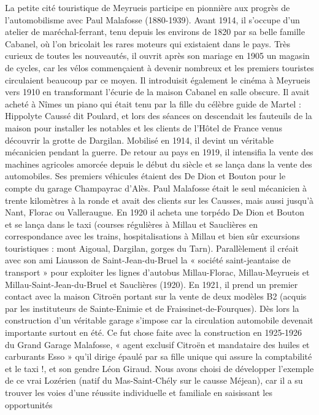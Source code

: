 La petite cité touristique de Meyrueis participe en pionnière aux progrès de l’automobilisme avec
Paul Malafosse (1880-1939). Avant 1914, il s’occupe d’un atelier de maréchal-ferrant, tenu
depuis les environs de 1820 par sa belle famille Cabanel, où l’on bricolait les rares moteurs qui
existaient dans le pays. Très curieux de toutes les nouveautés, il ouvrit après son mariage en 1905
un magasin de cycles, car les vélos commençaient à devenir nombreux et les premiers touristes circulaient beaucoup par ce moyen. Il introduisit également
le cinéma à Meyrueis vers 1910 en transformant l’écurie de la maison Cabanel en salle
obscure. Il avait acheté à Nîmes un piano qui était tenu par la fille du célèbre guide de Martel :
Hippolyte Caussé dit Poulard, et lors des séances on descendait les fauteuils de la maison pour
installer les notables et les clients de l’Hôtel de France venus découvrir la grotte de Dargilan.
Mobilisé en 1914, il devint un véritable mécanicien pendant la guerre. De retour au pays en 1919,
il intensifia la vente des machines agricoles amorcée depuis le début du siècle et se lança dans
la vente des automobiles. Ses premiers véhicules étaient des De Dion et Bouton pour le compte
du garage Champayrac d’Alès. Paul Malafosse était le seul mécanicien à trente kilomètres à la
ronde et avait des clients sur les Causses, mais aussi jusqu’à Nant, Florac ou Valleraugue. En 1920
il acheta une torpédo De Dion et Bouton et se lança dans le taxi (courses régulières à Millau et
Sauclières en correspondance avec les trains, hospitalisations à Millau et bien sûr excursions
touristiques : mont Aigoual, Dargilan, gorges du Tarn). Parallèlement il créait avec son ami
Liausson de Saint-Jean-du-Bruel la « société saint-jeantaise de transport » pour exploiter les
lignes d’autobus Millau-Florac, Millau-Meyrueis et Millau-Saint-Jean-du-Bruel et Sauclières
(1920). En 1921, il prend un premier contact avec la maison Citroën portant sur la vente de deux
modèles B2 (acquis par les instituteurs de Sainte-Enimie et de Fraissinet-de-Fourques). Dès lors la
construction d’un véritable garage s’impose car la circulation automobile devenait importante
surtout en été. Ce fut chose faite avec la construction en 1925-1926 du Grand Garage Malafosse,
« agent exclusif Citroën et mandataire des huiles et carburants Esso » qu’il dirige épaulé par sa
fille unique qui assure la comptabilité et le taxi !, et son gendre Léon Giraud. Nous avons choisi
de développer l’exemple de ce vrai Lozérien (natif du Mas-Saint-Chély sur le causse Méjean), car
il a su trouver les voies d’une réussite individuelle et familiale en saisissant les opportunités
